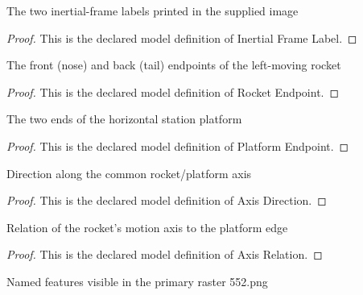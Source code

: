 \begin{definition}
  \label{def:physics:phyx-mini-0552:phyxminiproblems-problemphyxmini0552-inertialframelabel}
  The two inertial-frame labels printed in the supplied image
\end{definition}
\begin{proof}
  This is the declared model definition of Inertial Frame Label.
\end{proof}
\begin{definition}
  \label{def:physics:phyx-mini-0552:phyxminiproblems-problemphyxmini0552-rocketendpoint}
  The front (nose) and back (tail) endpoints of the left-moving rocket
\end{definition}
\begin{proof}
  This is the declared model definition of Rocket Endpoint.
\end{proof}
\begin{definition}
  \label{def:physics:phyx-mini-0552:phyxminiproblems-problemphyxmini0552-platformendpoint}
  The two ends of the horizontal station platform
\end{definition}
\begin{proof}
  This is the declared model definition of Platform Endpoint.
\end{proof}
\begin{definition}
  \label{def:physics:phyx-mini-0552:phyxminiproblems-problemphyxmini0552-axisdirection}
  Direction along the common rocket/platform axis
\end{definition}
\begin{proof}
  This is the declared model definition of Axis Direction.
\end{proof}
\begin{definition}
  \label{def:physics:phyx-mini-0552:phyxminiproblems-problemphyxmini0552-axisrelation}
  Relation of the rocket's motion axis to the platform edge
\end{definition}
\begin{proof}
  This is the declared model definition of Axis Relation.
\end{proof}
\begin{definition}
  \label{def:physics:phyx-mini-0552:phyxminiproblems-problemphyxmini0552-figurefeature}
  Named features visible in the primary raster 552.png
\end{definition}
